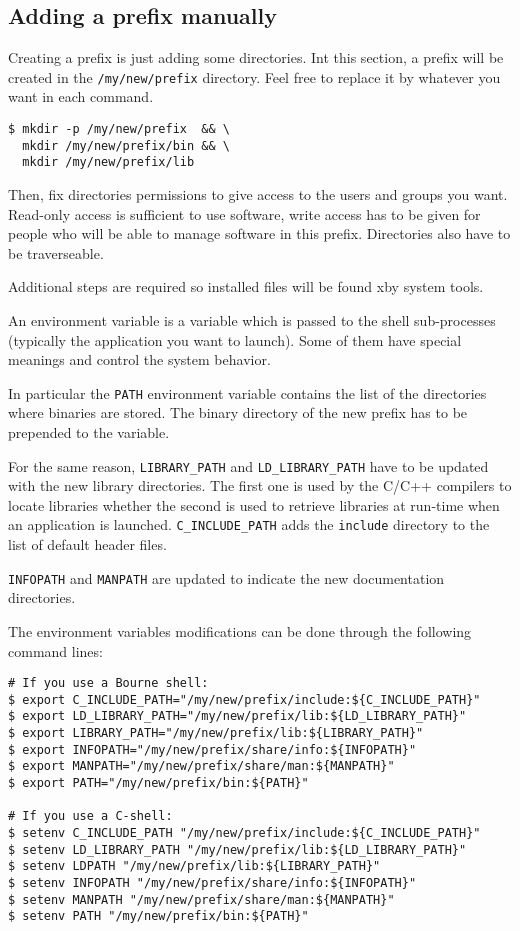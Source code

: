 \subsection{Adding a prefix manually}

Creating a prefix is just adding some directories. Int this section, a
prefix will be created in the \texttt{/my/new/prefix} directory. Feel
free to replace it by whatever you want in each command.

\begin{verbatim}
$ mkdir -p /my/new/prefix  && \
  mkdir /my/new/prefix/bin && \
  mkdir /my/new/prefix/lib
\end{verbatim}

Then, fix directories permissions to give access to the users and
groups you want. Read-only access is sufficient to use software, write
access has to be given for people who will be able to manage software
in this prefix. Directories also have to be traverseable.


Additional steps are required so installed files will be found xby
system tools.

An environment variable is a variable which is passed to the shell
sub-processes (typically the application you want to launch).  Some of
them have special meanings and control the system behavior.

In particular the \texttt{PATH} environment variable contains the list
of the directories where binaries are stored. The binary directory of
the new prefix has to be prepended to the variable.

For the same reason, \texttt{LIBRARY\_PATH} and
\texttt{LD\_LIBRARY\_PATH} have to be updated with the new library
directories. The first one is used by the C/C++ compilers to locate
libraries whether the second is used to retrieve libraries at run-time
when an application is launched. \texttt{C\_INCLUDE\_PATH} adds the
\texttt{include} directory to the list of default header files.

\texttt{INFOPATH} and \texttt{MANPATH} are updated to indicate the new
documentation directories.

The environment variables modifications can be done through the
following command lines:

\begin{verbatim}
# If you use a Bourne shell:
$ export C_INCLUDE_PATH="/my/new/prefix/include:${C_INCLUDE_PATH}"
$ export LD_LIBRARY_PATH="/my/new/prefix/lib:${LD_LIBRARY_PATH}"
$ export LIBRARY_PATH="/my/new/prefix/lib:${LIBRARY_PATH}"
$ export INFOPATH="/my/new/prefix/share/info:${INFOPATH}"
$ export MANPATH="/my/new/prefix/share/man:${MANPATH}"
$ export PATH="/my/new/prefix/bin:${PATH}"

# If you use a C-shell:
$ setenv C_INCLUDE_PATH "/my/new/prefix/include:${C_INCLUDE_PATH}"
$ setenv LD_LIBRARY_PATH "/my/new/prefix/lib:${LD_LIBRARY_PATH}"
$ setenv LDPATH "/my/new/prefix/lib:${LIBRARY_PATH}"
$ setenv INFOPATH "/my/new/prefix/share/info:${INFOPATH}"
$ setenv MANPATH "/my/new/prefix/share/man:${MANPATH}"
$ setenv PATH "/my/new/prefix/bin:${PATH}"
\end{verbatim}

